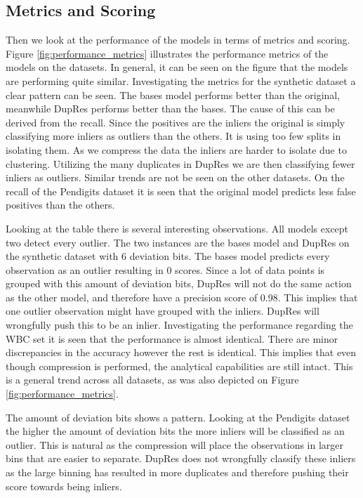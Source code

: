 \subsection{Metrics and Scoring}
Then we look at the performance of the models in terms of metrics and scoring. Figure \ref{fig:performance_metrics} illustrates the performance metrics of the models on the datasets. In general, it can be seen on the figure that the models are performing quite similar. Investigating the metrics for the synthetic dataset a clear pattern can be seen. The bases model performs better than the original, meanwhile DupRes performs better than the bases. The cause of this can be derived from the recall. Since the positives are the inliers the original is simply classifying more inliers as outliers than the others. It is using too few splits in isolating them. As we compress the data the inliers are harder to isolate due to clustering. Utilizing the many duplicates in DupRes we are then classifying fewer inliers as outliers. Similar trends are not be seen on the other datasets. On the recall of the Pendigits dataset it is seen that the original model predicts less false positives than the others.

Looking at the table there is several interesting observations. All models except two detect every outlier. The two instances are the bases model and DupRes on the synthetic dataset with 6 deviation bits. The bases model predicts every observation as an outlier resulting in 0 scores. Since a lot of data points is grouped with this amount of deviation bits, DupRes will not do the same action as the other model, and therefore have a precision score of 0.98. This implies that one outlier observation might have grouped with the inliers. DupRes will wrongfully push this to be an inlier. Investigating the performance regarding the WBC set it is seen that the performance is almost identical. There are minor discrepancies in the accuracy however the rest is identical. This implies that even though compression is performed, the analytical capabilities are still intact. This is a general trend across all datasets, as was also depicted on Figure \ref{fig:performance_metrics}.

The amount of deviation bits shows a pattern. Looking at the Pendigits dataset the higher the amount of deviation bits the more inliers will be classified as an outlier. This is natural as the compression will place the observations in larger bins that are easier to separate. DupRes does not wrongfully classify these inliers as the large binning has resulted in more duplicates and therefore pushing their score towards being inliers.

